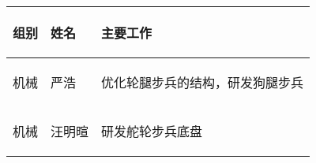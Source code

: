 
\begin{longtable}{ p{2cm} | p{3.5cm} | p{9.3cm} |}

    \hline

    \endfoot
    
    \rowcolor{tabhdcolor}

        \begin{center}
            组别
        \end{center} &
        \begin{center}
            姓名
        \end{center} &
        \begin{center}
            主要工作
        \end{center} \\

    \hline

    \endhead

        \begin{center}
            机械
        \end{center} &
        \begin{center}
            严浩
        \end{center} &
        \begin{center}
            优化轮腿步兵的结构，研发狗腿步兵
        \end{center}  \\
        
    \hline
        \begin{center}
            机械
        \end{center}&
        \begin{center}
            汪明暄
        \end{center}&
        \begin{center}
            研发舵轮步兵底盘
        \end{center}\\


\end{longtable}
